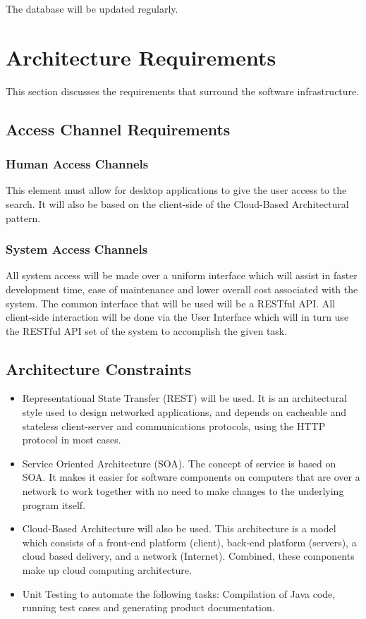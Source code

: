 \documentclass[a4paper,10pt]{article}
\begin{document}
	The database will be updated regularly.

	\newpage
	\section{Architecture Requirements}
	This section discusses the requirements that surround the software infrastructure.

	\subsection{Access Channel Requirements}
		\subsubsection{Human Access Channels}
	This element must allow for desktop applications to give the user access to the search.
	It will also be based on the client-side of the Cloud-Based Architectural pattern.

		\subsubsection{System Access Channels}
	All system access will be made over a uniform interface which will assist in faster development time, ease of maintenance and 		lower overall cost associated with the system. The common interface that will be used will be a RESTful API. All client-side 		interaction will be done via the User Interface which will in turn use the RESTful API set of the system to accomplish the given 	task.
	
	\subsection{Architecture Constraints}
	\begin{itemize}
		\item Representational State Transfer (REST) will be used. It is an architectural style used to design networked 	applications, and depends on cacheable and stateless client-server and communications protocols, using the HTTP protocol in most cases. 
		\item Service Oriented Architecture (SOA). The concept of service is based on SOA. It makes it easier for software components on computers that are over a network to work together with no need to make changes to the underlying program itself. 
		\item Cloud-Based Architecture will also be used. This architecture is a model which consists of a front-end platform (client), back-end platform (servers), a cloud based delivery, and a network (Internet). Combined, these components make up cloud computing architecture.
		\item Unit Testing to automate the following tasks: Compilation of Java code, running test cases and generating product documentation.
	\end{itemize}
	
\end{document}
